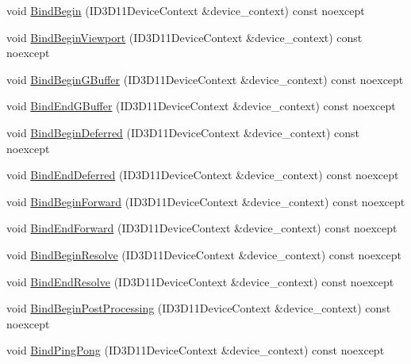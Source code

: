 \begin{DoxyCompactItemize}
void \mbox{\hyperlink{classmage_1_1rendering_1_1_output_manager_a9c753354655b7b218263832c343417d1}{Bind\+Begin}} (I\+D3\+D11\+Device\+Context \&device\+\_\+context) const noexcept
\item 
void \mbox{\hyperlink{classmage_1_1rendering_1_1_output_manager_a9101e210c5b04fefc52f2f14473c5742}{Bind\+Begin\+Viewport}} (I\+D3\+D11\+Device\+Context \&device\+\_\+context) const noexcept
\item 
void \mbox{\hyperlink{classmage_1_1rendering_1_1_output_manager_a93139563e5f5b58ccba4688c3b793e32}{Bind\+Begin\+G\+Buffer}} (I\+D3\+D11\+Device\+Context \&device\+\_\+context) const noexcept
\item 
void \mbox{\hyperlink{classmage_1_1rendering_1_1_output_manager_a380113a2b1c9049cfd2367a6344683b7}{Bind\+End\+G\+Buffer}} (I\+D3\+D11\+Device\+Context \&device\+\_\+context) const noexcept
\item 
void \mbox{\hyperlink{classmage_1_1rendering_1_1_output_manager_ad05f55888d2075806ae7a381031ecdfd}{Bind\+Begin\+Deferred}} (I\+D3\+D11\+Device\+Context \&device\+\_\+context) const noexcept
\item 
void \mbox{\hyperlink{classmage_1_1rendering_1_1_output_manager_af48d4e2671d7b84d3fd94961b926dd2a}{Bind\+End\+Deferred}} (I\+D3\+D11\+Device\+Context \&device\+\_\+context) const noexcept
\item 
void \mbox{\hyperlink{classmage_1_1rendering_1_1_output_manager_a678b86feab6fffb88752254a799d456d}{Bind\+Begin\+Forward}} (I\+D3\+D11\+Device\+Context \&device\+\_\+context) const noexcept
\item 
void \mbox{\hyperlink{classmage_1_1rendering_1_1_output_manager_ad0b43f26a2762ae116bc72b0cf21a6de}{Bind\+End\+Forward}} (I\+D3\+D11\+Device\+Context \&device\+\_\+context) const noexcept
\item 
void \mbox{\hyperlink{classmage_1_1rendering_1_1_output_manager_affa0c4b4c9c56807fe8ad4ed802fdfd9}{Bind\+Begin\+Resolve}} (I\+D3\+D11\+Device\+Context \&device\+\_\+context) const noexcept
\item 
void \mbox{\hyperlink{classmage_1_1rendering_1_1_output_manager_a548e6003d34916b174f74f6f1b5e85a2}{Bind\+End\+Resolve}} (I\+D3\+D11\+Device\+Context \&device\+\_\+context) const noexcept
\item 
void \mbox{\hyperlink{classmage_1_1rendering_1_1_output_manager_a6c22d77a812e3eacf32cfdb6d6a4d5f4}{Bind\+Begin\+Post\+Processing}} (I\+D3\+D11\+Device\+Context \&device\+\_\+context) const noexcept
\item 
void \mbox{\hyperlink{classmage_1_1rendering_1_1_output_manager_aacb8da12f24fe9b7f1c3aac6f52ba9a1}{Bind\+Ping\+Pong}} (I\+D3\+D11\+Device\+Context \&device\+\_\+context) const noexcept

\end{DoxyCompactItemize}
